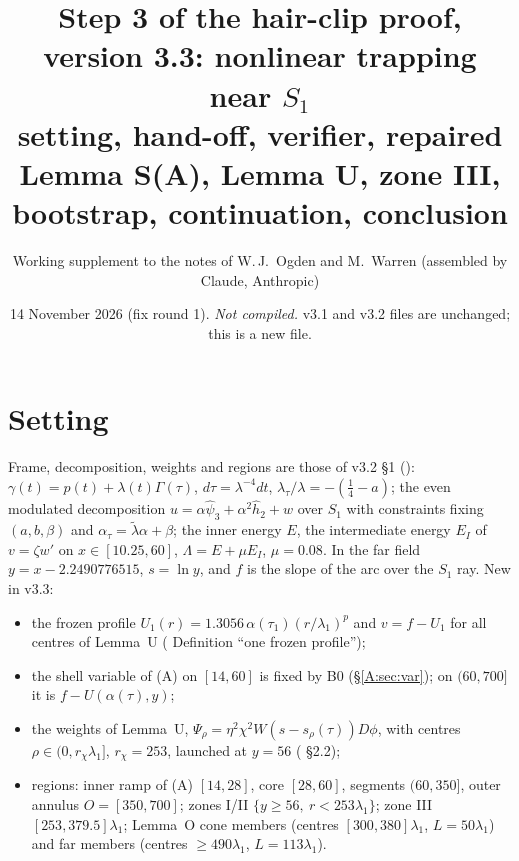 \documentclass[11pt]{article}
\title{Step 3 of the hair-clip proof, version 3.3: nonlinear trapping near $S_1$\\[2pt]\large setting, hand-off, verifier, repaired Lemma S(A), Lemma U, zone III, bootstrap, continuation, conclusion}
\author{Working supplement to the notes of W.\,J.~Ogden and M.~Warren (assembled by Claude, Anthropic)}
\date{14 November 2026 (fix round 1). \emph{Not compiled.} v3.1 and v3.2 files are unchanged; this is a new file.}
\begin{document}
\maketitle
\begin{center}\end{center}
\tableofcontents

\section{Setting}\label{M:sec:set}
Frame, decomposition, weights and regions are those of v3.2 \S1 (): $\gamma(t)=p(t)+\lambda(t)\Gamma(\tau)$, $d\tau=\lambda^{-4}dt$, $\lambda_\tau/\lambda=-(\frac14-a)$; the even modulated decomposition $u=\alpha\hat\psi_3+\alpha^2\hat h_2+w$ over $S_1$ with constraints fixing $(a,b,\beta)$ and $\alpha_\tau=\tilde\lambda\alpha+\beta$; the inner energy $E$, the intermediate energy $E_I$ of $v=\zeta w'$ on $x\in[10.25,60]$, $\Lambda=E+\mu E_I$, $\mu=0.08$. In the far field $y=x-2.2490776515$, $s=\ln y$, and $f$ is the slope of the arc over the $S_1$ ray. New in v3.3:
\begin{itemize}[leftmargin=*]
\item the frozen profile $U_1(r)=1.3056\,\alpha(\tau_1)(r/\lambda_1)^p$ and $v=f-U_1$ for all centres of Lemma~U ( Definition ``one frozen profile'');
\item the shell variable of (A) on $[14,60]$ is fixed by B0 (\S\ref{A:sec:var}); on $(60,700]$ it is $f-U(\alpha(\tau),y)$;
\item the weights of Lemma~U, $\Psi_\rho=\eta^2\chi^2W(s-s_\rho(\tau))D\phi$, with centres $\rho\in(0,r_\chi\lambda_1]$, $r_\chi=253$, launched at $y=56$ ( \S2.2);
\item regions: inner ramp of (A) $[14,28]$, core $[28,60]$, segments $(60,350]$, outer annulus $O=[350,700]$; zones I/II $\{y\ge56,\ r<253\lambda_1\}$; zone III $[253,379.5]\lambda_1$; Lemma~O cone members (centres $[300,380]\lambda_1$, $L=50\lambda_1$) and far members (centres $\ge490\lambda_1$, $L=113\lambda_1$).
\end{itemize}
\end{document}
